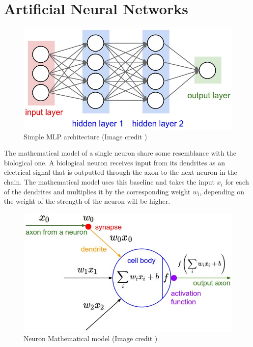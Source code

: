 \section{Artificial Neural Networks}
\begin{figure}[th]
    \centering
    \includegraphics[width=1.0\textwidth]{Figures/NeuralNet}
    \decoRule
    \caption[Simple MLP architecture]{Simple MLP architecture (Image credit \cite{cs231n})}
    \label{fig:mlp}
\end{figure}

The mathematical model of a single neuron share some resemblance with the biological one.
A biological neuron receives input from its dendrites as an electrical signal that is outputted through the axon to the next neuron in the chain.
The mathematical model uses this baseline and takes the input $x_i$ for each of the dendrites and multiplies it by the corresponding weight $w_i$,
depending on the weight of the strength of the neuron will be higher. 

\begin{figure}[th]
    \centering
    \includegraphics[width=1.0\textwidth]{Figures/Neuron}
    \decoRule
    \caption[Neuron Mathematical model]{Neuron Mathematical model (Image credit \cite{cs231n})}
    \label{fig:neuron}
\end{figure}

